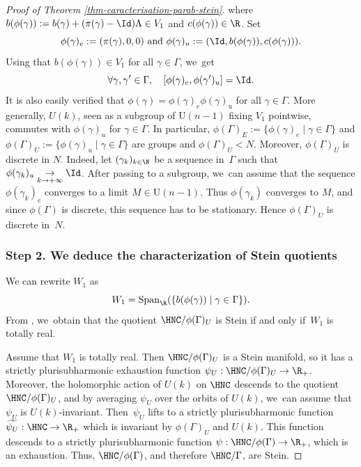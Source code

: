 \begin{proof}[Proof of Theorem \ref{thm-caracterisation-parab-stein}]
where $b(\phi(\gamma)):= b(\gamma) + (\pi(\gamma)-\Id)\Lambda \in V_1$ and $c(\phi(\gamma)) \in \R$. Set
\begin{equation*}
\phi(\gamma)_e:= (\pi(\gamma),0,0) \text{ and }
\phi(\gamma)_u:= (\Id,b(\phi(\gamma)),c(\phi(\gamma))).
\end{equation*}
Using that $b(\phi(\gamma))\in V_1$ for all $\gamma\in \Gamma$, we~get
\begin{equation*}
\forall \gamma,\gamma'\in \Gamma,\quad [\phi(\gamma)_e,\phi(\gamma')_u] = \Id.
\end{equation*}It is also easily verified that $\phi(\gamma) = \phi(\gamma)_e\phi(\gamma)_u$ for all $\gamma \in \Gamma$.
More generally, $U(k)$, seen as a subgroup of $\mathrm{U}(n-1)$ fixing $V_1$ pointwise, commutes with $\phi(\gamma)_u$ for $\gamma\in \Gamma$. In particular, $\phi(\Gamma)_E:= \{\phi(\gamma)_e \mid \gamma \in \Gamma\}$ and $\phi(\Gamma)_U:= \{\phi(\gamma)_u \mid \gamma \in \Gamma\}$ are groups and $\phi(\Gamma)_U<N$. Moreover, $\phi(\Gamma)_U$ is discrete in $N$. Indeed, let $(\gamma_k)_{k\in \N}$ be a sequence in~$\Gamma$ such that $\phi(\gamma_k)_u \underset{k\to +\infty}{\to} \Id$. After passing to a subgroup, we~can assume that the sequence $\phi(\gamma_k)_e$ converges to a limit $M\in \mathrm{U}(n-1)$. Thus $\phi(\gamma_k)$ converges to $M$, and since $\phi(\Gamma)$ is discrete, this sequence has to be stationary. Hence $\phi(\Gamma)_U$ is discrete in~$N$.

\subsubsection*{Step 2. We deduce the characterization of Stein quotients}

We can rewrite $W_1$ as
\begin{equation*}
W_1 = \operatorname{Span}_{\R}(\{b(\phi(\gamma)) \mid \gamma \in \Gamma\}).
\end{equation*}
From \cite[Th.\,1.4]{miebachQuotientsBoundedHomogeneous2024}, we~obtain that the quotient $\HNC/\phi(\Gamma)_U$ is Stein if and only if~$W_1$ is totally real.

Assume that $W_1$ is totally real. Then $\HNC/\phi(\Gamma)_U$ is a Stein manifold, so it has a strictly plurisubharmonic exhaustion function $\psi_U:\HNC/\phi(\Gamma)_U\to \R_+$. Moreover, the holomorphic action of $U(k)$ on $\HNC$ descends to the quotient $\HNC/\phi(\Gamma)_U$, and by averaging $\psi_U$ over the orbits of $U(k)$, we~can assume that $\psi_U$ is $U(k)$-invariant. Then~$\psi_U$ lifts to a strictly plurisubharmonic function $\widetilde{\psi_U}:\HNC\to \R_+$ which is invariant by $\phi(\Gamma)_U$ and $U(k)$. This function descends to a strictly plurisubharmonic function $\psi:\HNC/\phi(\Gamma)\to \R_+$, which is an exhaustion. Thus, $\HNC/\phi(\Gamma)$, and therefore $\HNC/\Gamma$, are Stein.


\end{proof}

